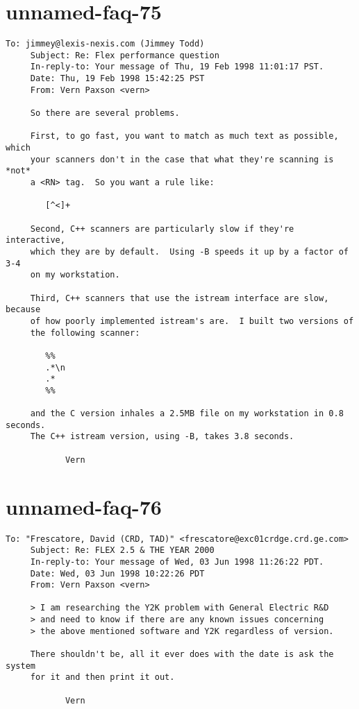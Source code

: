 \documentclass[openany,oneside]{book}
\begin{document}
\section{unnamed-faq-75}

\begin{verbatim}
To: jimmey@lexis-nexis.com (Jimmey Todd)
     Subject: Re: Flex performance question
     In-reply-to: Your message of Thu, 19 Feb 1998 11:01:17 PST.
     Date: Thu, 19 Feb 1998 15:42:25 PST
     From: Vern Paxson <vern>
     
     So there are several problems.
     
     First, to go fast, you want to match as much text as possible, which
     your scanners don't in the case that what they're scanning is *not*
     a <RN> tag.  So you want a rule like:
     
     	[^<]+
     
     Second, C++ scanners are particularly slow if they're interactive,
     which they are by default.  Using -B speeds it up by a factor of 3-4
     on my workstation.
     
     Third, C++ scanners that use the istream interface are slow, because
     of how poorly implemented istream's are.  I built two versions of
     the following scanner:
     
     	%%
     	.*\n
     	.*
     	%%
     
     and the C version inhales a 2.5MB file on my workstation in 0.8 seconds.
     The C++ istream version, using -B, takes 3.8 seconds.
     
     		Vern
\end{verbatim}

\section{unnamed-faq-76}

\begin{verbatim}
To: "Frescatore, David (CRD, TAD)" <frescatore@exc01crdge.crd.ge.com>
     Subject: Re: FLEX 2.5 & THE YEAR 2000
     In-reply-to: Your message of Wed, 03 Jun 1998 11:26:22 PDT.
     Date: Wed, 03 Jun 1998 10:22:26 PDT
     From: Vern Paxson <vern>
     
     > I am researching the Y2K problem with General Electric R&D
     > and need to know if there are any known issues concerning
     > the above mentioned software and Y2K regardless of version.
     
     There shouldn't be, all it ever does with the date is ask the system
     for it and then print it out.
     
     		Vern
\end{verbatim}
\end{document}
